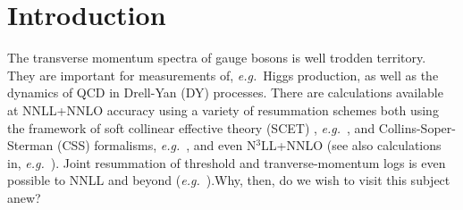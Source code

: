 \documentclass[a4,letterpaper,11pt]{article}
\newcommand{\eg}{\emph{e.g.}~}
\begin{document}
\section{Introduction}
\label{sec:Intro}

The transverse momentum spectra of gauge bosons is well trodden territory. They are important for measurements of, \eg Higgs production, as well as the dynamics of QCD in Drell-Yan (DY) processes. There are calculations available at NNLL+NNLO accuracy using a variety of resummation schemes both using the framework of soft collinear effective theory (SCET) \cite{Bauer:2000ew,Bauer:2000yr,Bauer:2001ct,Bauer:2001yt,Bauer:2002nz}, \eg \cite{Gao:2005iu,Idilbi:2005er,Mantry:2010mk,GarciaEchevarria:2011rb}, and Collins-Soper-Sterman (CSS) \cite{Collins:1984kg} formalisms, \eg \cite{deFlorian:2000pr,deFlorian:2001zd,Catani:2010pd,Bozzi:2010xn,Becher:2010tm}, and even N$^3$LL+NNLO \cite{Bizon:2017rah} (see also calculations in, \eg\cite{Li:2016axz,Li:2016ctv,Vladimirov:2016dll,Gehrmann:2014yya,Luebbert:2016itl,Echevarria:2015byo,Echevarria:2016scs}). Joint resummation of threshold and tranverse-momentum logs is even possible to NNLL and beyond (\eg \cite{Li:2016axz,Lustermans:2016nvk,Marzani:2016smx,Muselli:2017bad}).Why, then, do we wish to visit this subject anew? 
\end{document}
